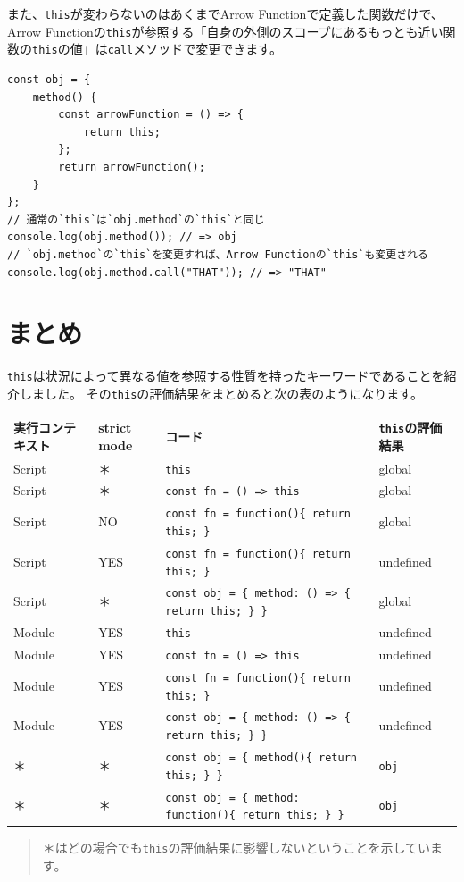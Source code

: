 また、\texttt{this}が変わらないのはあくまでArrow
Functionで定義した関数だけで、Arrow
Functionの\texttt{this}が参照する「自身の外側のスコープにあるもっとも近い関数の\texttt{this}の値」は\texttt{call}メソッドで変更できます。

\begin{lstlisting}
const obj = {
    method() {
        const arrowFunction = () => {
            return this;
        };
        return arrowFunction();
    }
};
// 通常の`this`は`obj.method`の`this`と同じ
console.log(obj.method()); // => obj
// `obj.method`の`this`を変更すれば、Arrow Functionの`this`も変更される
console.log(obj.method.call("THAT")); // => "THAT"
\end{lstlisting}

\hypertarget{conclusion}{%
\section{まとめ}\label{conclusion}}

\texttt{this}は状況によって異なる値を参照する性質を持ったキーワードであることを紹介しました。
その\texttt{this}の評価結果をまとめると次の表のようになります。

\begin{longtable}[]{@{}llll@{}}
\toprule
実行コンテキスト & strict mode & コード &
\texttt{this}の評価結果\tabularnewline
\midrule
\endhead
Script & ＊ & \texttt{this} & global\tabularnewline
Script & ＊ & \texttt{const fn = () => this} &
global\tabularnewline
Script & NO &
\texttt{const fn = function()\{ return this; \}} &
global\tabularnewline
Script & YES &
\texttt{const fn = function()\{ return this; \}} &
undefined\tabularnewline
Script & ＊ &
\texttt{const obj = \{ method: () => \{ return this; \} \}}
& global\tabularnewline
Module & YES & \texttt{this} & undefined\tabularnewline
Module & YES & \texttt{const fn = () => this} &
undefined\tabularnewline
Module & YES &
\texttt{const fn = function()\{ return this; \}} &
undefined\tabularnewline
Module & YES &
\texttt{const obj = \{ method: () => \{ return this; \} \}}
& undefined\tabularnewline
＊ & ＊ &
\texttt{const obj = \{ method()\{ return this; \} \}} &
\texttt{obj}\tabularnewline
＊ & ＊ &
\texttt{const obj = \{ method: function()\{ return this; \} \}}
& \texttt{obj}\tabularnewline
\bottomrule
\end{longtable}

\begin{quote}
＊はどの場合でも\texttt{this}の評価結果に影響しないということを示しています。
\end{quote}

